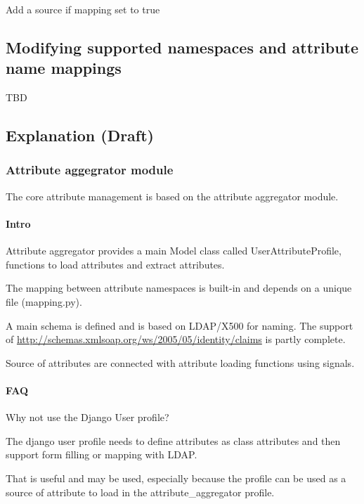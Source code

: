 \documentclass[letterpaper,10pt,english]{sphinxmanual}
\begin{document}
Add a source if mapping set to true


\subsection{Modifying supported namespaces and attribute name mappings}
\label{attribute_management:modifying-supported-namespaces-and-attribute-name-mappings}
TBD


\subsection{Explanation (Draft)}
\label{attribute_management:explanation-draft}

\subsubsection{Attribute aggegrator module}
\label{attribute_management:attribute-aggegrator-module}
The core attribute management is based on the attribute aggregator module.


\paragraph{Intro}
\label{attribute_management:intro}
Attribute aggregator provides a main Model class called UserAttributeProfile,
functions to load attributes and extract attributes.

The mapping between attribute namespaces is built-in and depends on a unique
file (mapping.py).

A main schema is defined and is based on LDAP/X500 for naming. The support
of \href{http://schemas.xmlsoap.org/ws/2005/05/identity/claims}{http://schemas.xmlsoap.org/ws/2005/05/identity/claims} is partly complete.

Source of attributes are connected with attribute loading functions using
signals.


\paragraph{FAQ}
\label{attribute_management:faq}
Why not use the Django User profile?

The django user profile needs to define attributes as class attributes and
then support form filling or mapping with LDAP.

That is useful and may be used, especially because the profile can be used as
a source of attribute to load in the attribute\_aggregator profile.
\end{document}
